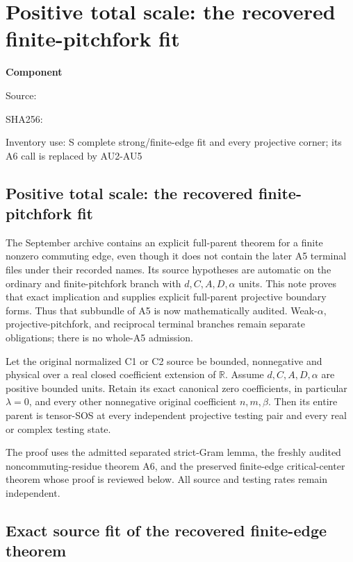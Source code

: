 \chapter{Positive total scale: the recovered finite-pitchfork fit}
\label{component:pfb0cf454f653}
\noindent\textbf{Component }\par
{\small\noindent Source: \par}
{\small\noindent SHA256: \par}
{\small\noindent Inventory use: S complete strong/finite-edge fit and every projective corner; its A6 call is replaced by AU2-AU5\par}
\medskip
\section{Positive total scale: the recovered finite-pitchfork fit}

The September archive contains an explicit full-parent theorem for a
finite nonzero commuting edge, even though it does not contain the later
A5 terminal files under their recorded names. Its source hypotheses are
automatic on the ordinary and finite-pitchfork branch with
$d,C,A,D,\alpha$ units. This note proves that exact implication and
supplies explicit full-parent projective boundary forms. Thus that
subbundle of A5 is now mathematically audited. Weak-$\alpha$,
projective-pitchfork, and reciprocal terminal branches remain separate
obligations; there is no whole-A5 admission.

\begin{theorem}
Let the original normalized C1 or C2 source be bounded, nonnegative and
physical over a real closed coefficient extension of $\mathbb R$.
Assume $d,C,A,D,\alpha$ are positive bounded units. Retain its exact
canonical zero coefficients, in particular $\lambda=0$, and every
other nonnegative original coefficient $n,m,\beta$. Then its entire
parent is tensor-SOS at every independent projective testing pair and
every real or complex testing state.
\end{theorem}

The proof uses the admitted separated strict-Gram lemma, the freshly
audited noncommuting-residue theorem A6, and the preserved finite-edge
critical-center theorem whose proof is reviewed below. All source and
testing rates remain independent.

\section{Exact source fit of the recovered finite-edge theorem}

